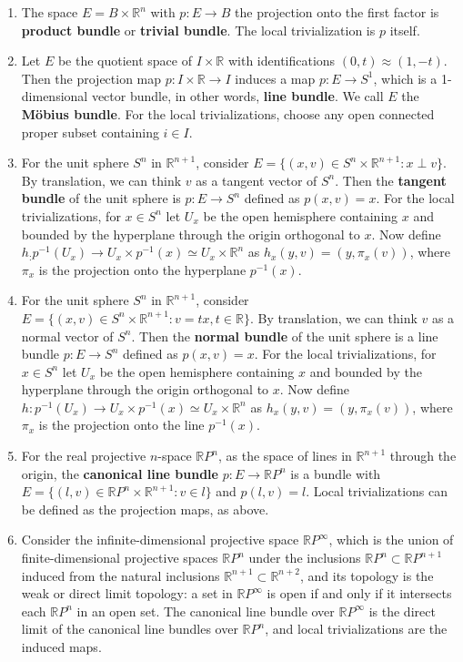\begin{exmp}
\begin{enumerate}
\item The space $E=B\times \mathbb{R}^n$ with $p:E\rightarrow B$ the projection onto the first factor is \textbf{product bundle} or \textbf{trivial bundle}. The local trivialization is $p$ itself.
\item Let $E$ be the quotient space of $I\times \mathbb{R}$ with identifications $(0,t)\approx (1,-t)$. Then the projection map $p:I\times \mathbb{R}\rightarrow I$ induces a map $p:E\rightarrow S^1$, which is a 1-dimensional vector bundle, in other words, \textbf{line bundle}. We call $E$ the \textbf{M{\"o}bius bundle}. For the local trivializations, choose any open connected proper subset containing $i\in I$.
\item For the unit sphere $S^n$ in $\mathbb{R}^{n+1}$, consider $E=\{(x,v)\in S^n\times \mathbb{R}^{n+1}:x\perp v\}$. By translation, we can think $v$ as a tangent vector of $S^n$. Then the \textbf{tangent bundle} of the unit sphere is $p:E\rightarrow S^n$ defined as $p(x,v)=x$. For the local trivializations, for $x\in S^n$ let $U_x$ be the open hemisphere containing $x$ and bounded by the hyperplane through the origin orthogonal to $x$. Now define $h_:p^{-1}(U_x)\rightarrow U_x\times p^{-1}(x)\simeq U_x\times \mathbb{R}^n$ as $h_x(y,v)=(y,\pi_x(v))$, where $\pi_x$ is the projection onto the hyperplane $p^{-1}(x)$.
\item For the unit sphere $S^n$ in $\mathbb{R}^{n+1}$, consider $E=\{(x,v)\in S^n\times \mathbb{R}^{n+1}:v=tx, t\in \mathbb{R}\}$. By translation, we can think $v$ as a normal vector of $S^n$. Then the \textbf{normal bundle} of the unit sphere is a line bundle $p:E\rightarrow S^n$ defined as $p(x,v)=x$. For the local trivializations, for $x\in S^n$ let $U_x$ be the open hemisphere containing $x$ and bounded by the hyperplane through the origin orthogonal to $x$. Now define $h:p^{-1}(U_x)\rightarrow U_x\times p^{-1}(x)\simeq U_x\times \mathbb{R}^n$ as $h_x(y,v)=(y,\pi_x(v))$, where $\pi_x$ is the projection onto the line $p^{-1}(x)$.
\item For the real projective $n$-space $\mathbb{R}P^n$, as the space of lines in $\mathbb{R}^{n+1}$ through the origin, the \textbf{canonical line bundle} $p:E\rightarrow \mathbb{R}P^n$ is a bundle with $E=\{(l,v)\in \mathbb{R}P^n\times \mathbb{R}^{n+1}:v\in l\}$ and $p(l,v)=l$. Local trivializations can be defined as the projection maps, as above.
\item Consider the infinite-dimensional projective space $\mathbb{R}P^\infty$, which is the union of finite-dimensional projective spaces $\mathbb{R}P^n$ under the inclusions $\mathbb{R}P^n\subset \mathbb{R}P^{n+1}$ induced from the natural inclusions $\mathbb{R}^{n+1}\subset \mathbb{R}^{n+2}$, and its topology is the weak or direct limit topology: a set in $\mathbb{R}P^{\infty}$ is open if and only if it intersects each $\mathbb{R}P^n$ in an open set. The canonical line bundle over $\mathbb{R}P^\infty$ is the direct limit of the canonical line bundles over $\mathbb{R}P^n$, and local trivializations are the induced maps.

\end{enumerate}
\end{exmp}
